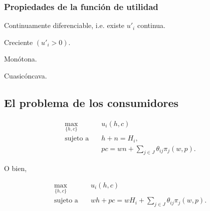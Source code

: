 \documentclass[8pt,a4paper]{extarticle}
\begin{document}
\begin{multicols}{3}
\subsubsection*{Propiedades de la función de utilidad}

\begin{eqlist}
\item Continuamente diferenciable, i.e. existe $u'_i$ continua.
\item Creciente $(u'_i > 0)$.
\item Monótona.
\item Cuasicóncava.
\end{eqlist}

\subsection{El problema de los consumidores}

\begin{equation*}
\begin{aligned}
	\max_{\{h, c\}}\	  & u_i(h, c) \\
	\text{sujeto a} \quad & h + n = H_i, \\
						  & pc = wn + \sum_{j \in J} \theta_{ij} \pi_j (w, p).
\end{aligned}
\end{equation*}

O bien,

\begin{equation*}
\begin{aligned}
	\max_{\{h, c\}}\	  & u_i(h, c) \\
	\text{sujeto a} \quad & wh + pc = wH_i + \sum_{j \in J} \theta_{ij} \pi_j (w, p).
\end{aligned}
\end{equation*}


\end{multicols}
\end{document}
